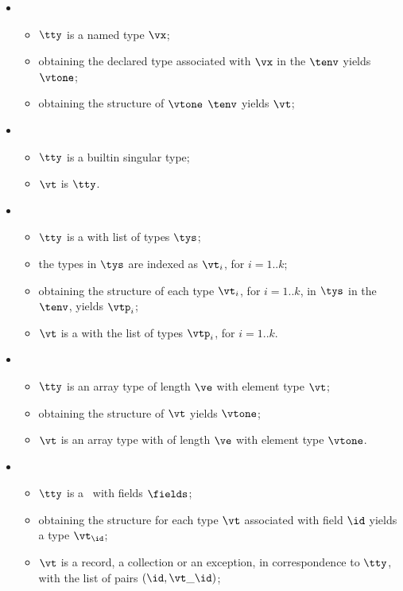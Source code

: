 \ProseParagraph
\OneApplies
\begin{itemize}
\item {}
  \begin{itemize}
  \item $\tty$ is a named type $\vx$;
  \item obtaining the declared type associated with $\vx$ in the \staticenvironmentterm{} $\tenv$ yields $\vtone$\ProseOrTypeError;
  \item obtaining the structure of $\vtone$ \staticenvironmentterm{} $\tenv$ yields $\vt$\ProseOrTypeError;
  \end{itemize}
\item {}
  \begin{itemize}
  \item $\tty$ is a builtin singular type;
  \item $\vt$ is $\tty$.
  \end{itemize}
\item {}
  \begin{itemize}
  \item $\tty$ is a \tupletypeterm{} with list of types $\tys$;
  \item the types in $\tys$ are indexed as $\vt_i$, for $i=1..k$;
  \item obtaining the structure of each type $\vt_i$, for $i=1..k$, in $\tys$ in the \staticenvironmentterm{} $\tenv$,
  yields $\vtp_i$\ProseOrTypeError;
  \item $\vt$ is a \tupletypeterm{} with the list of types $\vtp_i$, for $i=1..k$.
  \end{itemize}
\item {}
  \begin{itemize}
    \item $\tty$ is an array type of length $\ve$ with element type $\vt$;
    \item obtaining the structure of $\vt$ yields $\vtone$\ProseOrTypeError;
    \item $\vt$ is an array type with of length $\ve$ with element type $\vtone$.
  \end{itemize}
\item {}
  \begin{itemize}
  \item $\tty$ is a \structuredtypeterm\ with fields $\fields$;
  \item obtaining the structure for each type $\vt$ associated with field $\id$ yields a type $\vt_\id$\ProseOrTypeError;
  \item $\vt$ is a record, a collection or an exception, in correspondence to $\tty$, with the list of pairs $(\id, \vt\_\id)$;
  \end{itemize}
\end{itemize}


